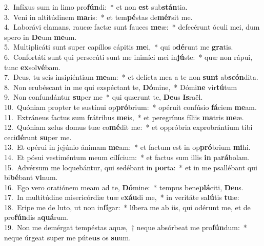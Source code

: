 {2.~}Infíxus sum in limo pro\textbf{fún}di:~* et non \textbf{est} sub\textbf{stán}tia.\\
{3.~}Veni in altitúdinem \textbf{ma}ris:~* et tem\textbf{pé}stas de\textbf{mér}sit me.\\
{4.~}Laborávi clamans, raucæ factæ sunt fauces \textbf{me}æ:~* defecérunt óculi mei, dum spero in \textbf{De}um \textbf{me}um.\\
{5.~}Multiplicáti sunt super capíllos cápitis \textbf{me}i,~* qui o\textbf{dé}runt me \textbf{gra}tis.\\
{6.~}Confortáti sunt qui persecúti sunt me inimíci mei in\textbf{jú}ste:~* quæ non rápui, tunc \textbf{ex}sol\textbf{vé}bam.\\
{7.~}Deus, tu scis insipiéntiam \textbf{me}am:~* et delícta mea a te non \textbf{sunt} ab\textbf{scón}dita.\\
{8.~}Non erubéscant in me qui exspéctant te, \textbf{Dó}mine,~* Dómi\textbf{ne} vir\textbf{tú}tum\\
{9.~}Non confundántur \textbf{su}per me~* qui quærunt te, \textbf{De}us \textbf{Is}raël.\\
{10.~}Quóniam propter te sustínui op\textbf{pró}brium:~* opéruit confúsio \textbf{fá}ciem \textbf{me}am.\\
{11.~}Extráneus factus sum frátribus \textbf{me}is,~* et peregrínus fíliis \textbf{ma}tris \textbf{me}æ.\\
{12.~}Quóniam zelus domus tuæ co\textbf{mé}dit me:~* et oppróbria exprobrántium tibi ceci\textbf{dé}runt \textbf{su}per me.\\
{13.~}Et opérui in jejúnio ánimam \textbf{me}am:~* et factum est in op\textbf{pró}brium \textbf{mi}hi.\\
{14.~}Et pósui vestiméntum meum ci\textbf{lí}cium:~* et factus sum illis \textbf{in} pa\textbf{rá}bolam.\\
{15.~}Advérsum me loquebántur, qui sedébant in \textbf{por}ta:~* et in me psallébant qui bi\textbf{bé}bant \textbf{vi}num.\\
{16.~}Ego vero oratiónem meam ad te, \textbf{Dó}mine:~* tempus bene\textbf{plá}citi, \textbf{De}us.\\
{17.~}In multitúdine misericórdiæ tuæ e\textbf{xáu}di me,~* in veritáte sa\textbf{lú}tis \textbf{tu}æ:\\
{18.~}Eripe me de luto, ut non in\textbf{fí}gar:~* líbera me ab iis, qui odérunt me, et de pro\textbf{fún}dis a\textbf{quá}rum.\\
{19.~}Non me demérgat tempéstas aquæ,~† neque absórbeat me pro\textbf{fún}dum:~* neque úrgeat super me púte\textbf{us} os \textbf{su}um.\\
